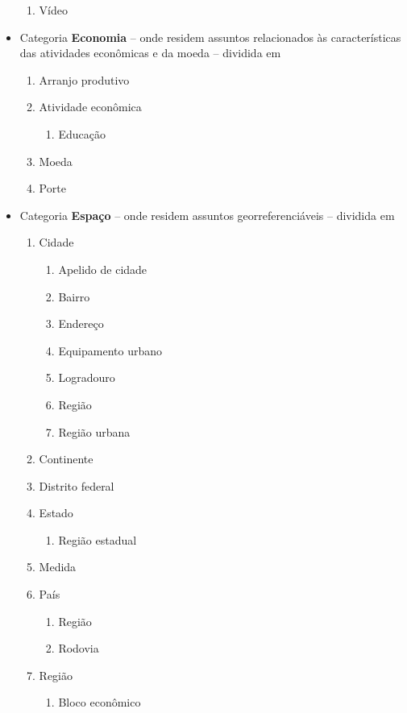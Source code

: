 \begin{multicols}{2}
\begin{itemize}
\begin{enumerate}
			\item Vídeo				
\end{enumerate}	\item Categoria \textbf{Economia} -- onde residem assuntos relacionados às características das atividades econômicas e da moeda -- dividida em	\begin{enumerate} 	\item Arranjo produtivo				
			\item Atividade econômica	\begin{enumerate}			
					\item Educação	\end{enumerate}	
			\item Moeda				
			\item Porte				
\end{enumerate}	\item Categoria \textbf{Espaço} -- onde residem assuntos georreferenciáveis -- dividida em	\begin{enumerate} 	\item Cidade	\begin{enumerate}			
					\item Apelido de cidade		
					\item Bairro		
					\item Endereço		
					\item Equipamento urbano		
					\item Logradouro		
					\item Região		
					\item Região urbana	\end{enumerate}	
			\item Continente				
			\item Distrito federal				
			\item Estado	\begin{enumerate}			
					\item Região estadual	\end{enumerate}	
			\item Medida				
			\item País	\begin{enumerate}			
					\item Região		
					\item Rodovia	\end{enumerate}	
			\item Região	\begin{enumerate}			
					\item Bloco econômico	\end{enumerate}	

\end{enumerate}
\end{itemize}
\end{multicols}
